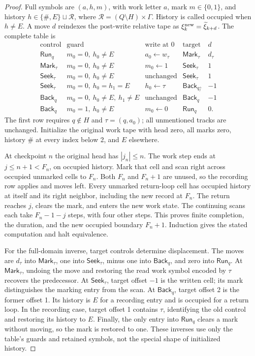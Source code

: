 \begin{proof}\label{ba:occupied-compiler-proof}
Full symbols are $(a,h,m)$, with work letter $a$, mark $m\in\{0,1\}$,
and history $h\in\{\#,E\}\sqcup\mathcal R$, where
$\mathcal R=(Q\setminus H)\times\Gamma$.  History is called occupied
when $h\ne E$.  A move $d$ reindexes the post-write relative tape as
$\xi^{\rm new}_k=\widetilde\xi_{k+d}$.  The complete table is
\[
\begin{array}{c|l|l|c|r}
\text{control}&\text{guard}&\text{write at }0&\text{target}&d\\\hline
\mathsf{Run}_q&m_0=0,\ h_0\ne E&a_0\leftarrow w_\tau&
 \mathsf{Mark}_\tau&d_\tau\\
\mathsf{Mark}_\tau&m_0=0,\ h_0\ne E&m_0\leftarrow1&
 \mathsf{Seek}_\tau&1\\
\mathsf{Seek}_\tau&m_0=0,\ h_0\ne E&\text{unchanged}&
 \mathsf{Seek}_\tau&1\\
\mathsf{Seek}_\tau&m_0=0,\ h_0=h_1=E&h_0\leftarrow\tau&
 \mathsf{Back}_{q^+_\tau}&-1\\
\mathsf{Back}_q&m_0=0,\ h_0\ne E,\ h_1\ne E&\text{unchanged}&
 \mathsf{Back}_q&-1\\
\mathsf{Back}_q&m_0=1,\ h_0\ne E&m_0\leftarrow0&
 \mathsf{Run}_q&0.
\end{array}
\]
The first row requires $q\notin H$ and $\tau=(q,a_0)$; all unmentioned
tracks are unchanged.  Initialize the original work tape with head zero,
all marks zero, history $\#$ at every index below 2, and $E$ elsewhere.

At checkpoint $n$ the original head has $|j_n|\le n$.  The work step
ends at $j\le n+1<F_n$, on occupied history.  Mark that cell and scan
right across occupied unmarked cells to $F_n$.  Both $F_n$ and $F_n+1$
are unused, so the recording row applies and moves left.  Every unmarked
return-loop cell has occupied history at itself and its right neighbor,
including the new record at $F_n$.  The return reaches $j$, clears the
mark, and enters the new work state.  The continuing scans each take
$F_n-1-j$ steps, with four other steps.  This proves finite completion,
the duration, and the new occupied boundary $F_n+1$.  Induction gives
the stated computation and halt equivalence.

For the full-domain inverse, target controls determine displacement.
The moves are $d_\tau$ into $\mathsf{Mark}_\tau$, one into
$\mathsf{Seek}_\tau$, minus one into $\mathsf{Back}_q$, and zero
into $\mathsf{Run}_q$.  At $\mathsf{Mark}_\tau$, undoing the
move and restoring the read work symbol encoded by $\tau$ recovers the
predecessor.  At $\mathsf{Seek}_\tau$, target offset $-1$ is the
written cell; its mark distinguishes the marking entry from the scan.
At $\mathsf{Back}_q$, target offset 2 is the former offset 1.  Its
history is $E$ for a recording entry and is occupied for a return loop.
In the recording case, target offset 1 contains $\tau$, identifying
the old control and restoring its history to $E$.  Finally, the only
entry into $\mathsf{Run}_q$ clears a mark without moving, so the mark
is restored to one.  These inverses use only the table's guards and
retained symbols, not the special shape of initialized history.
\end{proof}

